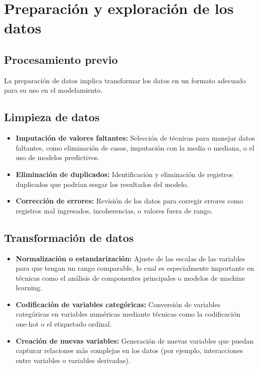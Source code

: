 \documentclass[
  letterpaper,
  DIV=11,
  numbers=noendperiod]{scrreprt}
\providecommand{\tightlist}{%
  \setlength{\itemsep}{0pt}\setlength{\parskip}{0pt}}\usepackage{longtable,booktabs,array}
\begin{document}

\chapter{Preparación y exploración de los
datos}\label{preparaciuxf3n-y-exploraciuxf3n-de-los-datos-1}

\section{Procesamiento previo}\label{procesamiento-previo}

La preparación de datos implica transformar los datos en un formato
adecuado para su uso en el modelamiento.

\section{Limpieza de datos}\label{limpieza-de-datos}

\begin{itemize}
\tightlist
\item
  \textbf{Imputación de valores faltantes:} Selección de técnicas para
  manejar datos faltantes, como eliminación de casos, imputación con la
  media o mediana, o el uso de modelos predictivos.
\item
  \textbf{Eliminación de duplicados:} Identificación y eliminación de
  registros duplicados que podrían sesgar los resultados del modelo.
\item
  \textbf{Corrección de errores:} Revisión de los datos para corregir
  errores como registros mal ingresados, incoherencias, o valores fuera
  de rango.
\end{itemize}

\section{Transformación de datos}\label{transformaciuxf3n-de-datos}

\begin{itemize}
\tightlist
\item
  \textbf{Normalización o estandarización:} Ajuste de las escalas de las
  variables para que tengan un rango comparable, lo cual es
  especialmente importante en técnicas como el análisis de componentes
  principales o modelos de machine learning.
\item
  \textbf{Codificación de variables categóricas:} Conversión de
  variables categóricas en variables numéricas mediante técnicas como la
  codificación one-hot o el etiquetado ordinal.
\item
  \textbf{Creación de nuevas variables:} Generación de nuevas variables
  que puedan capturar relaciones más complejas en los datos (por
  ejemplo, interacciones entre variables o variables derivadas).
\end{itemize}
\end{document}
